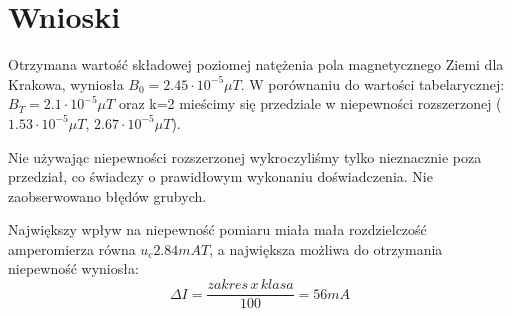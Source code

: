 \documentclass{article}
\begin{document}
\section{Wnioski}

Otrzymana wartość składowej poziomej natężenia pola magnetycznego Ziemi dla Krakowa, wyniosła $B_0 = 2.45 \cdot 10^{-5} \mu T$. W porównaniu do wartości tabelarycznej: $B_T = 2.1 \cdot 10^{-5} \mu T$ oraz k=2 mieścimy się przedziale w niepewności rozszerzonej ($1.53 \cdot 10^{-5} \mu T$, $2.67 \cdot 10^{-5} \mu T$).

Nie używając niepewności rozszerzonej wykroczyliśmy tylko nieznacznie poza przedział, co świadczy o prawidłowym wykonaniu doświadczenia. Nie zaobserwowano błędów grubych.

Największy wpływ na niepewność pomiaru miała mała rozdzielczość amperomierza równa $u_c 2.84 mA T$, a największa możliwa do otrzymania niepewność wyniosła: \begin{equation}
\Delta I = \frac{zakres \, x \, klasa}{100} = 56 mA
\end{equation}





\end{document}
